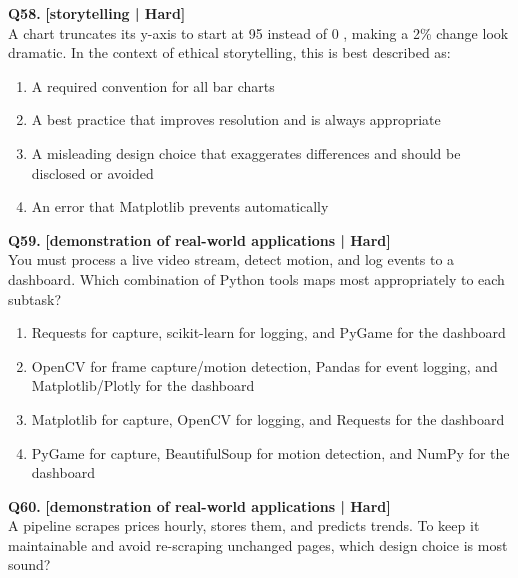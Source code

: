 \noindent\textbf{Q58.} \hfill {\small\color{LPUOrange}\textbf{[storytelling | Hard]}}\\[2pt]
A chart truncates its y-axis to start at 95 instead of 0 , making a 2\% change look dramatic. In the context of ethical storytelling, this is best described as:

\begin{enumerate}[label=(\alph*),topsep=2pt,itemsep=1pt,partopsep=0pt,parsep=0pt]
    \item \relax A required convention for all bar charts
    \item \relax A best practice that improves resolution and is always appropriate
    \item \relax A misleading design choice that exaggerates differences and should be disclosed or avoided
    \item \relax An error that Matplotlib prevents automatically
\end{enumerate}
\vspace{2mm}

\noindent\textbf{Q59.} \hfill {\small\color{LPUOrange}\textbf{[demonstration of real-world applications | Hard]}}\\[2pt]
You must process a live video stream, detect motion, and log events to a dashboard. Which combination of Python tools maps most appropriately to each subtask?

\begin{enumerate}[label=(\alph*),topsep=2pt,itemsep=1pt,partopsep=0pt,parsep=0pt]
    \item \relax Requests for capture, scikit-learn for logging, and PyGame for the dashboard
    \item \relax OpenCV for frame capture/motion detection, Pandas for event logging, and Matplotlib/Plotly for the dashboard
    \item \relax Matplotlib for capture, OpenCV for logging, and Requests for the dashboard
    \item \relax PyGame for capture, BeautifulSoup for motion detection, and NumPy for the dashboard
\end{enumerate}
\vspace{2mm}

\noindent\textbf{Q60.} \hfill {\small\color{LPUOrange}\textbf{[demonstration of real-world applications | Hard]}}\\[2pt]
A pipeline scrapes prices hourly, stores them, and predicts trends. To keep it maintainable and avoid re-scraping unchanged pages, which design choice is most sound?

